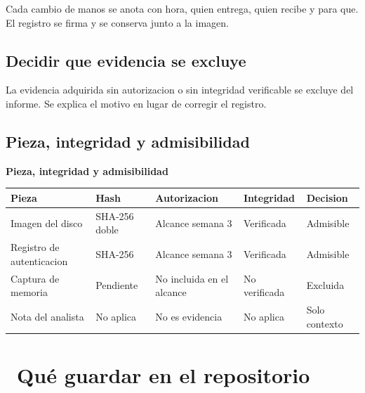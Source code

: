\documentclass[11pt,a4paper]{article}
\newcommand{\iconotexto}[2]{\textcolor{cyanNeon}{\faIcon{#1}}~#2}
\begin{document}
Cada cambio de manos se anota con hora, quien entrega, quien recibe y para que. El registro se firma y se conserva junto a la imagen.

\subsection{Decidir que evidencia se excluye}

La evidencia adquirida sin autorizacion o sin integridad verificable se excluye del informe. Se explica el motivo en lugar de corregir el registro.

\subsection{Pieza, integridad y admisibilidad}

\begin{center}
\begin{minipage}{\linewidth}
\centering
{\footnotesize
\textbf{Pieza, integridad y admisibilidad}\par\smallskip
\begin{tabular}{@{}>{\raggedright\arraybackslash}p{2.60cm}>{\raggedright\arraybackslash}p{2.40cm}>{\raggedright\arraybackslash}p{2.60cm}>{\raggedright\arraybackslash}p{2.20cm}>{\raggedright\arraybackslash}p{3.00cm}@{}}
\toprule
\textbf{Pieza} & \textbf{Hash} & \textbf{Autorizacion} & \textbf{Integridad} & \textbf{Decision} \\
\midrule
Imagen del disco & SHA-256 doble & Alcance semana 3 & Verificada & Admisible \\
Registro de autenticacion & SHA-256 & Alcance semana 3 & Verificada & Admisible \\
Captura de memoria & Pendiente & No incluida en el alcance & No verificada & Excluida \\
Nota del analista & No aplica & No es evidencia & No aplica & Solo contexto \\
\bottomrule
\end{tabular}
}
\par{}
\end{minipage}
\end{center}

\section{\iconotexto{box-open}{Qué guardar en el repositorio}}
\end{document}
